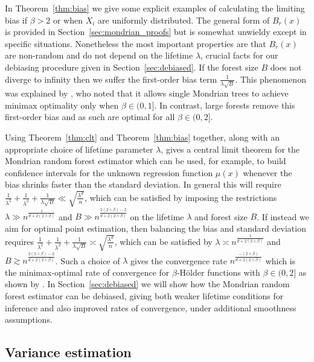 In Theorem~\ref{thm:bias} we give some explicit examples
of calculating the limiting bias if $\beta > 2$
or when $X_i$ are uniformly distributed.
The general form of $B_r(x)$ is provided in
Section~\ref{sec:mondrian_proofs}
but is somewhat unwieldy except
in specific situations.
Nonetheless the most important properties are that $B_r(x)$
are non-random and
do not depend on the lifetime $\lambda$,
crucial facts for our debiasing procedure given in
Section~\ref{sec:debiased}.
If the forest size $B$ does not diverge to infinity
then we suffer the first-order bias term $\frac{1}{\lambda \sqrt B}$.
This phenomenon was explained by \citet{mourtada2020minimax},
who noted that it allows single Mondrian trees to achieve
minimax optimality only when $\beta \in (0, 1]$.
In contrast, large forests remove this first-order bias
and as such are optimal for all $\beta \in (0, 2]$.

Using Theorem~\ref{thm:clt} and Theorem~\ref{thm:bias} together,
along with an appropriate choice of lifetime parameter $\lambda$,
gives a central limit theorem for the Mondrian random forest estimator
which can be used, for example, to build confidence intervals
for the unknown regression function $\mu(x)$
whenever the bias shrinks faster than the standard deviation.
In general this will require
$\frac{1}{\lambda^2} + \frac{1}{\lambda^\beta} + \frac{1}{\lambda \sqrt B}
\ll \sqrt{\frac{\lambda^d}{n}}$,
which can be satisfied by imposing the restrictions
$\lambda \gg n^{\frac{1}{d + 2(2 \wedge \beta)}}$
and $B \gg n^{\frac{2(2 \wedge \beta) - 2}{d + 2(2 \wedge \beta)}}$
on the lifetime $\lambda$ and forest size $B$.
If instead we aim for optimal point estimation,
then balancing the bias and standard deviation requires
$\frac{1}{\lambda^2} + \frac{1}{\lambda^\beta} + \frac{1}{\lambda \sqrt B}
\asymp \sqrt{\frac{\lambda^d}{n}}$,
which can be satisfied by
$\lambda \asymp n^{\frac{1}{d + 2(2 \wedge \beta)}}$
and $B \gtrsim n^{\frac{2(2 \wedge \beta) - 2}{d + 2(2 \wedge \beta)}}$.
Such a choice of $\lambda$ gives the convergence rate
$n^{\frac{-(2 \wedge \beta)}{d + 2(2 \wedge \beta)}}$
which is the minimax-optimal rate of convergence
\citep{stone1982optimal}
for $\beta$-H{\"o}lder functions with $\beta \in (0,2]$
as shown by \citet[Theorem~2]{mourtada2020minimax}.
In Section~\ref{sec:debiased} we will show how the Mondrian random forest
estimator can be debiased, giving both weaker lifetime conditions for inference
and also improved rates of convergence, under additional smoothness assumptions.

\subsection*{Variance estimation}

